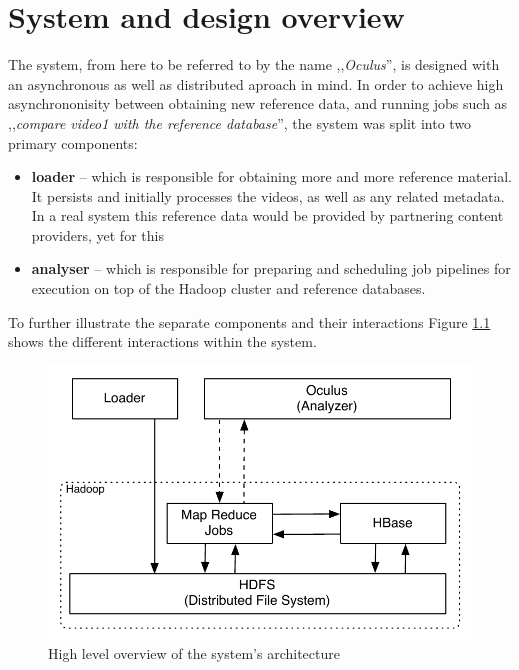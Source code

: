 
\chapter{System and design overview}
\label{chap:system-design}

The system, from here to be referred to by the name ,,\textit{Oculus}'', is designed with an asynchronous as well as distributed aproach in mind. In order to achieve high asynchrononisity between obtaining new reference data, and running jobs such as ,,\textit{compare video1 with the reference database}'', the system was split into two primary components: 

\begin{itemize}
  \item \textbf{loader} -- which is responsible for obtaining more and more reference material. It persists and initially processes the videos, as well as any related metadata. In a real system this reference data would be provided by partnering content providers, yet for this 
  \item \textbf{analyser} -- which is responsible for preparing and scheduling job pipelines for execution on top of the Hadoop cluster and reference databases.
\end{itemize}

To further illustrate the separate components and their interactions Figure \ref{fig:system-overview} shows the different interactions within the system.

\begin{figure}[hc!]
 \centering
  \includegraphics[scale=0.9]{./diagrams/high-level-system.pdf}
  \caption{High level overview of the system's architecture}
  \label{fig:system-overview}
\end{figure}

